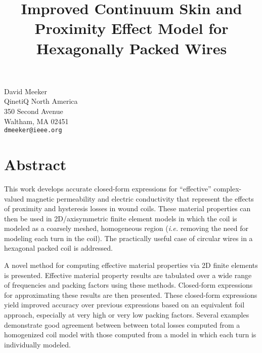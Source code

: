 

\title{Improved Continuum Skin and Proximity Effect Model for Hexagonally Packed Wires }
\author{} \institute{} %
\maketitle
\begin{center}
{\large David Meeker}\\
QinetiQ North America\\
350 Second Avenue \\
Waltham, MA 02451 \\
{\tt dmeeker@ieee.org}\\
\end{center}

\section*{Abstract}

This work develops accurate closed-form expressions for ``effective''
complex-valued magnetic permeability and electric conductivity that
represent the effects of proximity and hysteresis losses in wound coils.
These material properties can then be used in 2D/axisymmetric finite element
models in which the coil is modeled as a coarsely meshed, homogeneous region
({\em i.e.} removing the need for modeling each turn in the coil). The
practically useful case of circular wires in a hexagonal packed coil is
addressed.

A novel method for computing effective material properties via 2D finite
elements is presented. Effective material property results are tabulated
over a wide range of frequencies and packing factors using these methods. 
Closed-form expressions for approximating these results are then presented.
These closed-form expressions yield improved accuracy over previous
expressions based on an equivalent foil approach, especially at very high or
very low packing factors. Several examples demonstrate good agreement
between between total losses computed from a homogenized coil model with
those computed from a model in which each turn is individually modeled.

